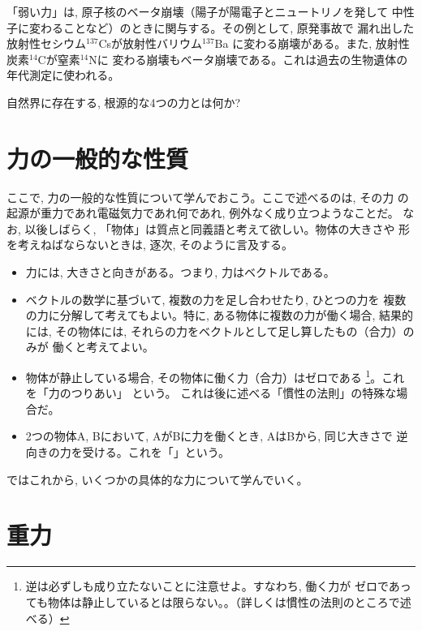 「弱い力」は, 原子核のベータ崩壊（陽子が陽電子とニュートリノを発して
中性子に変わることなど）のときに関与する。その例として, 原発事故で
漏れ出した放射性セシウム$^{137}$Csが放射性バリウム$^{137}$Ba
に変わる崩壊がある。また, 放射性炭素$^{14}$Cが窒素$^{14}$Nに
変わる崩壊もベータ崩壊である。これは過去の生物遺体の年代測定に使われる。

\begin{q}\label{q:4forece}
自然界に存在する, 根源的な4つの力とは何か?
\end{q}
\hv


\section{力の一般的な性質}

ここで, 力の一般的な性質について学んでおこう。ここで述べるのは, その力
の起源が重力であれ電磁気力であれ何であれ, 例外なく成り立つようなことだ。
なお, 以後しばらく, 「物体」は質点と同義語と考えて欲しい。物体の大きさや
形を考えねばならないときは, 逐次, そのように言及する。

\begin{itemize}
\item 力には, 大きさと向きがある。つまり, 力はベクトルである。
\item ベクトルの数学に基づいて, 複数の力を足し合わせたり, ひとつの力を
複数の力に分解して考えてもよい。特に, ある物体に複数の力が働く場合, 結果的
には, その物体には, それらの力をベクトルとして足し算したもの（合力）のみが
働くと考えてよい。
\item 物体が静止している場合, その物体に働く力（合力）はゼロである
\footnote{逆は必ずしも成り立たないことに注意せよ。すなわち, 働く力が
ゼロであっても物体は静止しているとは限らない。。（詳しくは慣性の法則のところで述べる）}。これを「力のつりあい」 という。
これは後に述べる「慣性の法則」の特殊な場合だ。
\item 2つの物体A, Bにおいて, AがBに力を働くとき, AはBから, 同じ大きさで
逆向きの力を受ける。これを「」という。
\end{itemize}
\mv
ではこれから, いくつかの具体的な力について学んでいく。\\



\section{重力}

